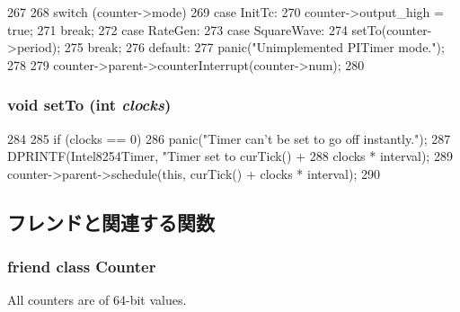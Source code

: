 \begin{DoxyCode}
267 {
268     switch (counter->mode) {
269       case InitTc:
270         counter->output_high = true;
271         break;
272       case RateGen:
273       case SquareWave:
274         setTo(counter->period);
275         break;
276       default:
277         panic("Unimplemented PITimer mode.\n");
278     }
279     counter->parent->counterInterrupt(counter->num);
280 }
\end{DoxyCode}
\hypertarget{classIntel8254Timer_1_1Counter_1_1CounterEvent_a4c9a6b4dc5fd7f9ed1cfa6587d824b2c}{
\subsubsection[{setTo}]{\setlength{\rightskip}{0pt plus 5cm}void setTo (int {\em clocks})}}
\label{classIntel8254Timer_1_1Counter_1_1CounterEvent_a4c9a6b4dc5fd7f9ed1cfa6587d824b2c}



\begin{DoxyCode}
284 {
285     if (clocks == 0)
286         panic("Timer can't be set to go off instantly.\n");
287     DPRINTF(Intel8254Timer, "Timer set to curTick() + %
288             clocks * interval);
289     counter->parent->schedule(this, curTick() + clocks * interval);
290 }
\end{DoxyCode}


\subsection{フレンドと関連する関数}
\hypertarget{classIntel8254Timer_1_1Counter_1_1CounterEvent_ab25f3b4c3811997d7268d73eb481f239}{
\subsubsection[{Counter}]{\setlength{\rightskip}{0pt plus 5cm}friend class {\bf Counter}}}
\label{classIntel8254Timer_1_1Counter_1_1CounterEvent_ab25f3b4c3811997d7268d73eb481f239}
All counters are of 64-\/bit values.

